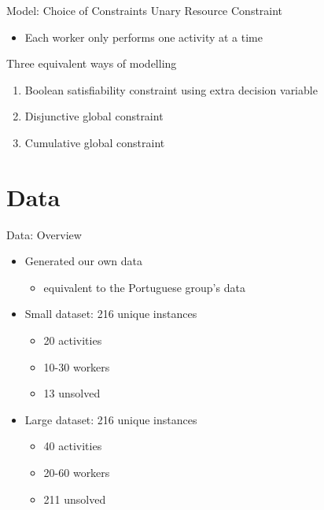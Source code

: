 \documentclass{beamer}
\begin{document}
\begin{frame}{Model: Choice of Constraints}
	Unary Resource Constraint
	\vspace{1mm}
	\begin{itemize}
		\item Each worker only performs one activity at a time\pause
	\end{itemize}
	\vspace{5mm}
	Three equivalent ways of modelling\pause
	\vspace{1mm}
	\begin{enumerate}
		\item Boolean satisfiability constraint using extra decision variable\pause
		\vspace{1mm}
		\item Disjunctive global constraint\pause
		\vspace{1mm}
		\item Cumulative global constraint
	\end{enumerate}
\end{frame}


\section{Data}
\begin{frame}{Data: Overview}
	\begin{itemize}
		\pause
		\item Generated our own data
		\begin{itemize}
			\item equivalent to the Portuguese group's data\pause
		\end{itemize}
		\vspace{2mm}
		\item Small dataset: 216 unique instances
		\begin{itemize}
			\item 20 activities
			\vspace{1mm}
			\item 10-30 workers\pause
			\vspace{1mm}
			\item \alert{13 unsolved}\pause
		\end{itemize}
		\vspace{2mm}
		\item Large dataset: 216 unique instances
		\begin{itemize}
			\item 40 activities
			\vspace{1mm}
			\item 20-60 workers\pause
			\vspace{1mm}
			\item \alert{211 unsolved}
		\end{itemize}
	\end{itemize}
\end{frame}
\end{document}
